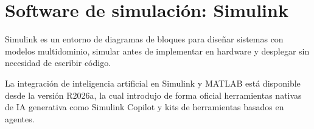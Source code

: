 \section{Software de simulación: Simulink}

Simulink es un entorno de diagramas de bloques para diseñar sistemas con modelos multidominio, simular antes de implementar en hardware y desplegar sin necesidad de escribir código.

La integración de inteligencia artificial en Simulink y MATLAB está disponible desde la versión R2026a, la cual introdujo de forma oficial herramientas nativas de IA generativa como Simulink Copilot y kits de herramientas basados en agentes.
